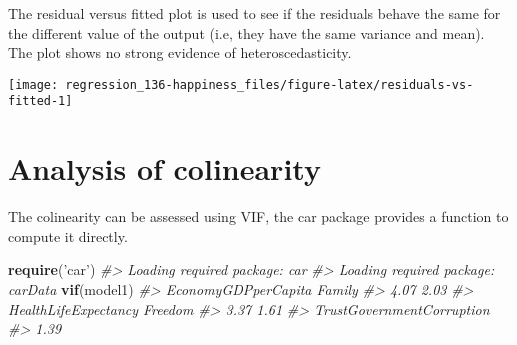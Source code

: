 \documentclass[]{book}
\newenvironment{Shaded}{\begin{snugshade}}{\end{snugshade}}
\newcommand{\CommentTok}[1]{\textcolor[rgb]{0.56,0.35,0.01}{\textit{#1}}}
\newcommand{\DataTypeTok}[1]{\textcolor[rgb]{0.13,0.29,0.53}{#1}}
\newcommand{\FloatTok}[1]{\textcolor[rgb]{0.00,0.00,0.81}{#1}}
\newcommand{\KeywordTok}[1]{\textcolor[rgb]{0.13,0.29,0.53}{\textbf{#1}}}
\newcommand{\NormalTok}[1]{#1}
\newcommand{\OperatorTok}[1]{\textcolor[rgb]{0.81,0.36,0.00}{\textbf{#1}}}
\newcommand{\StringTok}[1]{\textcolor[rgb]{0.31,0.60,0.02}{#1}}
\begin{document}
The residual versus fitted plot is used to see if the residuals behave the same for the different value of the output (i.e, they have the same variance and mean). The plot shows no strong evidence of heteroscedasticity.

\begin{Shaded}
\end{Shaded}

\begin{center}\texttt{[image: regression\_136-happiness\_files/figure-latex/residuals-vs-fitted-1]} \end{center}

\hypertarget{analysis-of-colinearity}{%
\section{Analysis of colinearity}\label{analysis-of-colinearity}}

The colinearity can be assessed using VIF, the car package provides a function to compute it directly.

\begin{Shaded}
\begin{Highlighting}[]
\KeywordTok{require}\NormalTok{(}\StringTok{'car'}\NormalTok{)}
\CommentTok{#> Loading required package: car}
\CommentTok{#> Loading required package: carData}
\KeywordTok{vif}\NormalTok{(model1)}
\CommentTok{#>       EconomyGDPperCapita                    Family }
\CommentTok{#>                      4.07                      2.03 }
\CommentTok{#>      HealthLifeExpectancy                   Freedom }
\CommentTok{#>                      3.37                      1.61 }
\CommentTok{#> TrustGovernmentCorruption }
\CommentTok{#>                      1.39}
\end{Highlighting}
\end{Shaded}
\end{document}

